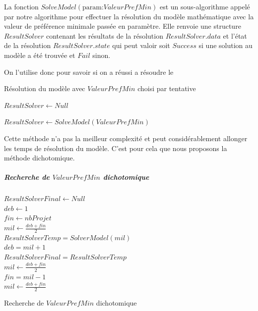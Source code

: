 \documentclass[final,poster]{polytech/polytech}
\begin{document}
La fonction $SolveModel(\text{param:} ValeurPrefMin)$ est un sous-algorithme appelé par notre algorithme pour effectuer la résolution du modèle mathématique avec la valeur de préférence minimale passée en paramètre.
Elle renvoie une structure $ResultSolver$ contenant les résultats de la résolution $ResultSolver.data$ et l'état de la résolution $ResultSolver.state$ qui peut valoir soit $Success$ si une solution au modèle a été trouvée et $Fail$ sinon.

On l'utilise donc pour savoir si on a réussi a résoudre le
\begin{algorithm}
\caption{\label{chap:problem_affectation:algo:recherche_tatonnement}Résolution du modèle avec $ValeurPrefMin$ choisi par tentative}

$ResultSolver \gets Null$ \\

{

	$ResultSolver \gets SolveModel(ValeurPrefMin)$ \\



	{
		\Break

	}
}
\end{algorithm}

Cette méthode n'a pas la meilleur complexité et peut considérablement allonger les temps de résolution du modèle. C'est pour cela que nous proposons la méthode dichotomique.

\subparagraph{Recherche de $ValeurPrefMin$ dichotomique}
\begin{algorithm}
$ResultSolverFinal \gets Null$ \\
$deb \gets 1$ \\
$fin \gets nbProjet$ \\
$mil \gets \frac{deb+fin}{2}$ \\
{
	$ResultSolverTemp=SolverModel(mil)$\\
{
$deb=mil+1$\\
$ResultSolverFinal=ResultSolverTemp$\\
$mil \gets \frac{deb+fin}{2}$ \\
}
\Else
{
	$fin=mil-1$\\
	$mil \gets \frac{deb+fin}{2}$ \\
}
}

\caption{\label{chap:problem_affectation:algo:recherche_dichotomique}Recherche de $ValeurPrefMin$ dichotomique}
\end{algorithm}
\end{document}
